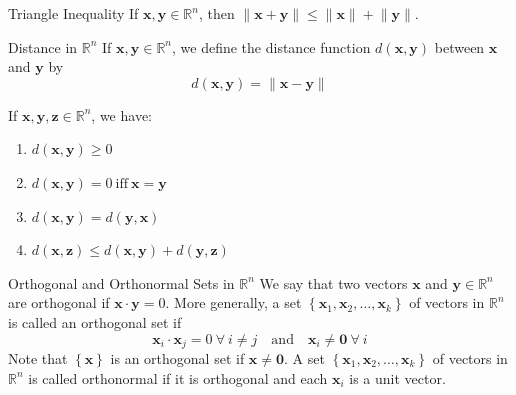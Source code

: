 \documentclass[12pt]{article}
\begin{document}
\begin{corollary}{Triangle Inequality}{}
    If $ \mathbf{x}, \mathbf{y} \in \mathbb{R}^n $, then $ \lVert \mathbf{x} + \mathbf{y} \rVert \leq \lVert \mathbf{x} \rVert + \lVert \mathbf{y} \rVert $.
\end{corollary}

\begin{definition}{Distance in $ \mathbb{R}^n $}{}
    If $ \mathbf{x}, \mathbf{y} \in \mathbb{R}^n $, we define the distance function $ d \left( \mathbf{x}, \mathbf{y} \right) $ between $ \mathbf{x} $ and $ \mathbf{y} $ by
    \[ d \left( \mathbf{x}, \mathbf{y} \right) = \lVert \mathbf{x} - \mathbf{y} \rVert \]
\end{definition}

\begin{theorem}{}{}
    If $ \mathbf{x}, \mathbf{y}, \mathbf{z} \in \mathbb{R}^n $, we have:
    \begin{enumerate}
        \item $ d \left( \mathbf{x}, \mathbf{y} \right) \geq 0 $
        \item $ d \left( \mathbf{x}, \mathbf{y} \right) = 0 \ \text{iff} \ \mathbf{x} = \mathbf{y} $
        \item $ d \left( \mathbf{x}, \mathbf{y} \right) = d \left( \mathbf{y}, \mathbf{x} \right) $
        \item $ d \left( \mathbf{x}, \mathbf{z} \right) \leq d \left( \mathbf{x}, \mathbf{y} \right) + d \left( \mathbf{y}, \mathbf{z} \right) $
    \end{enumerate}
\end{theorem}

\begin{definition}{Orthogonal and Orthonormal Sets in $ \mathbb{R}^n $}{}
    We say that two vectors $ \mathbf{x} $ and $ \mathbf{y} \in \mathbb{R}^n $ are orthogonal if $ \mathbf{x} \cdot \mathbf{y} = 0 $. More generally, a set $ \left\{ \mathbf{x}_1, \mathbf{x}_2, \dots, \mathbf{x}_k \right\} $ of vectors in $ \mathbb{R}^n $ is called an orthogonal set if
    \[ \mathbf{x}_i \cdot \mathbf{x}_j = 0 \ \forall \ i \neq j \quad \text{and} \quad \mathbf{x}_i \neq \mathbf{0} \ \forall \ i \]
    Note that $ \left\{ \mathbf{x} \right\} $ is an orthogonal set if $ \mathbf{x} \neq \mathbf{0} $. A set $ \left\{ \mathbf{x}_1, \mathbf{x}_2, \dots, \mathbf{x}_k \right\} $ of vectors in $ \mathbb{R}^n $ is called orthonormal if it is orthogonal and each $ \mathbf{x}_i $ is a unit vector.
\end{definition}
\end{document}
